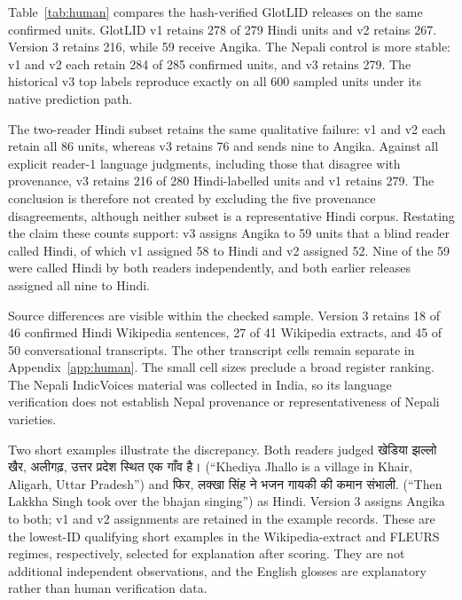 \documentclass[final]{clv2025}
\newcommand{\dev}[1]{{\devfont #1}}
\newcommand{\fitexhibit}[1]{\sbox{\exhibitbox}{}\ifdim\wd\exhibitbox>\linewidth\resizebox{\linewidth}{!}{\usebox{\exhibitbox}}\else\usebox{\exhibitbox}\fi}
\newcommand{\exhibit}[1]{\fitexhibit{tables/#1.tex}}
\begin{document}
Table~\ref{tab:human} compares the hash-verified GlotLID releases on the same confirmed units. GlotLID v1 retains 278 of 279 Hindi units and v2 retains 267. Version 3 retains 216, while 59 receive Angika. The Nepali control is more stable: v1 and v2 each retain 284 of 285 confirmed units, and v3 retains 279. The historical v3 top labels reproduce exactly on all 600 sampled units under its native prediction path.

\begin{table}[tb]\centering\small\exhibit{human_summary}
\caption{Retention on the existing blinded verification sample. The primary subset requires reader 1 to confirm provenance; the stricter subset requires both readers. Counts and proportions are descriptive within these selected subsets.}\label{tab:human}
\end{table}

The two-reader Hindi subset retains the same qualitative failure: v1 and v2 each retain all 86 units, whereas v3 retains 76 and sends nine to Angika. Against all explicit reader-1 language judgments, including those that disagree with provenance, v3 retains 216 of 280 Hindi-labelled units and v1 retains 279. The conclusion is therefore not created by excluding the five provenance disagreements, although neither subset is a representative Hindi corpus. Restating the claim these counts support: v3 assigns Angika to 59 units that a blind reader called Hindi, of which v1 assigned 58 to Hindi and v2 assigned 52. Nine of the 59 were called Hindi by both readers independently, and both earlier releases assigned all nine to Hindi.

Source differences are visible within the checked sample. Version 3 retains 18 of 46 confirmed Hindi Wikipedia sentences, 27 of 41 Wikipedia extracts, and 45 of 50 conversational transcripts. The other transcript cells remain separate in Appendix~\ref{app:human}. The small cell sizes preclude a broad register ranking. The Nepali IndicVoices material was collected in India, so its language verification does not establish Nepal provenance or representativeness of Nepali varieties.

Two short examples illustrate the discrepancy. Both readers judged \dev{खेडिया झल्लो खैर, अलीगढ़, उत्तर प्रदेश स्थित एक गाँव है।} (``Khediya Jhallo is a village in Khair, Aligarh, Uttar Pradesh'') and \dev{फिर, लक्खा सिंह ने भजन गायकी की कमान संभाली.} (``Then Lakkha Singh took over the bhajan singing'') as Hindi. Version 3 assigns Angika to both; v1 and v2 assignments are retained in the example records. These are the lowest-ID qualifying short examples in the Wikipedia-extract and FLEURS regimes, respectively, selected for explanation after scoring. They are not additional independent observations, and the English glosses are explanatory rather than human verification data.
\end{document}
